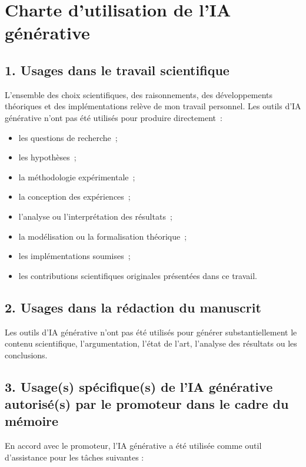 \chapter{Charte d'utilisation de l'IA générative}

\section*{1. Usages dans le travail scientifique}

L'ensemble des choix scientifiques, des raisonnements, des développements théoriques et des implémentations relève de mon travail personnel. Les outils d'IA générative n'ont pas été utilisés pour produire directement~:

\begin{itemize}
  \item les questions de recherche~;
  \item les hypothèses~;
  \item la méthodologie expérimentale~;
  \item la conception des expériences~;
  \item l'analyse ou l'interprétation des résultats~;
  \item la modélisation ou la formalisation théorique~;
  \item les implémentations soumises~;
  \item les contributions scientifiques originales présentées dans ce travail.
\end{itemize}

\section*{2. Usages dans la rédaction du manuscrit}

Les outils d'IA générative n'ont pas été utilisés pour générer substantiellement le contenu scientifique, l'argumentation, l'état de l'art, l'analyse des résultats ou les conclusions.

\section*{3. Usage(s) spécifique(s) de l'IA générative autorisé(s) par le promoteur dans le cadre du mémoire}


En accord avec le promoteur, l'IA générative a été utilisée comme 
outil d'assistance pour les tâches suivantes :

